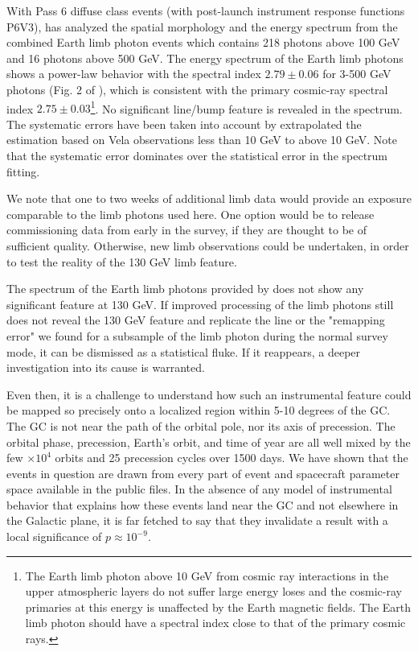 \documentclass[aps,twocolumn,prd,superscriptaddress,showpacs,nofootinbib,fixfloat]{revtex4}
\begin{document}
With Pass 6 diffuse class events (with post-launch
instrument response functions P6V3), \citep{FermiLimb} has
analyzed the spatial morphology and the energy spectrum from
the combined Earth limb photon events which contains 218
photons above 100 GeV and 16 photons above 500 GeV. The
energy spectrum of the Earth limb photons shows a power-law
behavior with the spectral index $2.79\pm 0.06$ for 3-500
GeV photons (Fig. 2 of \cite{FermiLimb}), which is
consistent with the primary cosmic-ray spectral index
$2.75\pm 0.03$\footnote{The Earth limb photon above 10 GeV
  from cosmic ray interactions in the upper atmospheric
  layers do not suffer large energy loses and the cosmic-ray
  primaries at this energy is unaffected by the Earth
  magnetic fields. The Earth limb photon should have a
  spectral index close to that of the primary cosmic
  rays. }. No significant line/bump feature is revealed in
the spectrum. The systematic errors have been taken into
account by extrapolated the estimation based on Vela
observations less than 10 GeV to above 10 GeV. Note that the
systematic error dominates over the statistical error in the
spectrum fitting.


We note that one to two weeks of additional limb data would
provide an exposure comparable to the limb photons used
here.  One option would be to release commissioning data
from early in the survey, if they are thought to be of
sufficient quality.  Otherwise, new limb observations could
be undertaken, in order to test the reality of the 130 GeV
limb feature.

The spectrum of the Earth limb photons provided by
\citep{FermiLimb} does not show any significant feature at
130 GeV. If improved processing of the limb photons still
does not reveal the 130 GeV feature and replicate the line
or the "remapping error" we found for a subsample of the
limb photon during the normal survey mode, it can be
dismissed as a statistical fluke.  If it reappears, a deeper
investigation into its cause is warranted.

Even then, it is a challenge to understand how such an
instrumental feature could be mapped so precisely onto a
localized region within 5-10 degrees of the GC.  The GC is
not near the path of the orbital pole, nor its axis of
precession.  The orbital phase, precession, Earth's orbit,
and time of year are all well mixed by the few $\times10^4$
orbits and 25 precession cycles over 1500 days.  We have
shown that the events in question are drawn from every part
of event and spacecraft parameter space available in the
public files.  In the absence of any model of instrumental
behavior that explains how these events land near the GC and
not elsewhere in the Galactic plane, it is far fetched to
say that they invalidate a result with a local significance
of $p\approx10^{-9}$.
\end{document}
